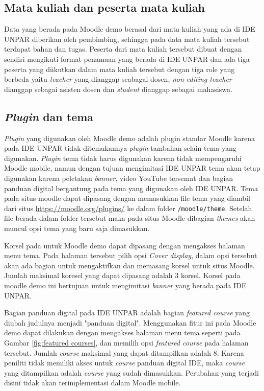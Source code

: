 \subsection{Mata kuliah dan peserta mata kuliah}

Data yang berada pada Moodle demo berasal dari mata kuliah yang ada di IDE UNPAR diberikan oleh pembimbing, sehingga pada data mata kuliah tersebut terdapat bahan dan tugas. Peserta dari mata kuliah tersebut dibuat dengan sendiri mengikuti format penamaan yang berada di IDE UNPAR dan ada tiga peserta yang diikutkan dalam mata kuliah tersebut dengan tiga role yang berbeda yaitu \textit{teacher} yang dianggap seabagai dosen, \textit{non-editing teacher} dianggap sebagai asisten dosen dan \textit{student} dianggap sebagai mahasiswa.

\subsection{\textit{Plugin} dan tema}

\textit{Plugin} yang digunakan oleh Moodle demo adalah plugin standar Moodle karena pada IDE UNPAR tidak ditemukannya \textit{plugin} tambahan selain tema yang digunakan. \textit{Plugin} tema tidak harus digunakan karena tidak mempengaruhi Moodle mobile, namun dengan tujuan mengimitasi IDE UNPAR tema akan tetap digunakan karena peletakan \textit{banner}, video YouTube tersemat dan bagian panduan digital bergantung pada tema yang digunakan oleh IDE UNPAR. Tema pada situs moodle dapat dipasang dengan memasukkan file tema yang diambil dari situs \url{https://moodle.org/plugins/} ke dalam folder \texttt{/moodle/theme}. Setelah file berada dalam folder tersebut maka pada situs Moodle dibagian \textit{themes} akan muncul opsi tema yang baru saja dimasukkan.

Korsel pada untuk Moodle demo dapat dipasang dengan mengakses halaman menu tema. Pada halaman tersebut pilih opsi \textit{Cover display}, dalam opsi tersebut akan ada bagian untuk mengaktifkan dan memasang korsel untuk situs Moodle. Jumlah maksimal koresel yang dapat dipasang adalah 3 korsel. Korsel pada moodle demo ini bertujuan untuk mengimitasi \textit{banner} yang berada pada IDE UNPAR.

Bagian panduan digital pada IDE UNPAR adalah bagian \textit{featured course} yang diubah judulnya menjadi "panduan digital". Menggunakan fitur ini pada Moodle demo dapat dilakukan dengan mengakses halaman menu tema seperti pada Gambar \ref{fig:featured courses}, dan memilih opsi \textit{featured course} pada halaman tersebut. Jumlah \textit{course} maksimal yang dapat ditampilkan adalah 8. Karena peniliti tidak memiliki akses untuk \textit{course} panduan digital IDE, maka \textit{course} yang ditampilkan adalah \textit{course} yang sudah dimasukkan. Perubahan yang terjadi disini tidak akan terimplementasi dalam Moodle mobile.

